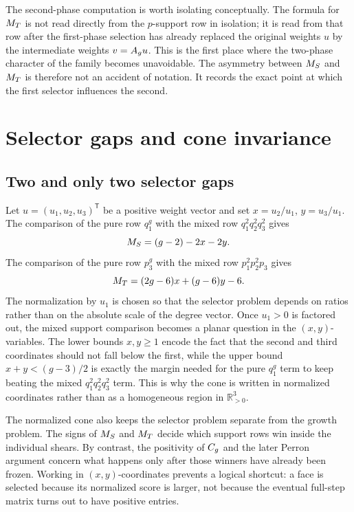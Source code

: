 \documentclass[11pt]{article}
\theoremstyle{remark}
\numberwithin{equation}{section}
\begin{document}
The second-phase computation is worth isolating conceptually.  The formula for
\(M_T\) is not read directly from the \(p\)-support row in isolation; it is
read from that row after the first-phase selection has already replaced the
original weights \(u\) by the intermediate weights \(v=A_g u\).  This is the
first place where the two-phase character of the family becomes unavoidable.
The asymmetry between \(M_S\) and \(M_T\) is therefore not an accident of
notation.  It records the exact point at which the first selector influences
the second.

\section{Selector gaps and cone invariance}\label{sec:selectors}

\subsection{Two and only two selector gaps}\label{sec:two-gaps}

Let \(u=(u_1,u_2,u_3)^{\mathsf T}\) be a positive weight vector and set
\(x=u_2/u_1\), \(y=u_3/u_1\).  The comparison of the pure row \(q_1^g\) with
the mixed row \(q_1^2q_2^2q_3^2\) gives
\[
M_S=(g-2)-2x-2y.
\]
The comparison of the pure row \(p_3^g\) with the mixed row
\(p_1^2p_2^2p_3\) gives
\[
M_T=(2g-6)x+(g-6)y-6.
\]
The normalization by \(u_1\) is chosen so that the selector problem depends on
ratios rather than on the absolute scale of the degree vector.  Once \(u_1>0\)
is factored out, the mixed support comparison becomes a planar question in the
\((x,y)\)-variables.  The lower bounds \(x,y\geq 1\) encode the fact that the
second and third coordinates should not fall below the first, while the upper
bound \(x+y<(g-3)/2\) is exactly the margin needed for the pure \(q_1^g\) term
to keep beating the mixed \(q_1^2q_2^2q_3^2\) term.  This is why the cone is
written in normalized coordinates rather than as a homogeneous region in
\(\mathbb R_{>0}^3\).

The normalized cone also keeps the selector problem separate from the growth
problem.  The signs of \(M_S\) and \(M_T\) decide which support rows win inside
the individual shears.  By contrast, the positivity of \(C_g\) and the later
Perron argument concern what happens only after those winners have already been
frozen.  Working in \((x,y)\)-coordinates prevents a logical shortcut: a face
is selected because its normalized score is larger, not because the eventual
full-step matrix turns out to have positive entries.
\end{document}
